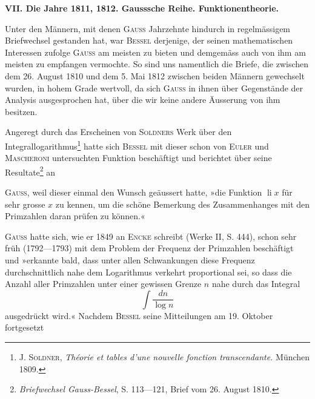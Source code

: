 \par\bigskip
\begin{center}
\textbf{VII. Die Jahre 1811, 1812. Gausssche Reihe. Funktionentheorie.}\\[6pt]
\end{center}
\noindent\hspace*{\parindent}Unter den Männern, mit denen \textsc{Gauss} Jahrzehnte hindurch in regelmässigem
Briefwechsel gestanden hat, war \textsc{Bessel} derjenige, der seinen mathematischen
Interessen zufolge \textsc{Gauss} am meisten zu bieten und demgemäss
auch von ihm am meisten zu empfangen vermochte. So sind uns namentlich
die Briefe, die zwischen dem 26. August 1810 und dem 5. Mai 1812 zwischen
beiden Männern gewechselt wurden, in hohem Grade wertvoll, da sich \textsc{Gauss}
in ihnen über Gegenstände der Analysis ausgesprochen hat, über die wir
keine andere Äusserung von ihm besitzen.
\par
Angeregt durch das Erscheinen von \textsc{Soldners} Werk über den Integrallogarithmus\footnote{J. \textsc{Soldner}, \textit{Théorie et tables d’une nouvelle fonction transcendante.} München 1809.}
hatte sich \textsc{Bessel} mit dieser schon von \textsc{Euler} und \textsc{Mascheroni}
untersuchten Funktion beschäftigt und berichtet über seine Resultate\footnote{\textit{Briefwechsel Gauss-Bessel}, S. 113—121, Brief vom 26. August 1810.} an\par
\clearpage{}
\noindent \textsc{Gauss}, weil dieser einmal den Wunsch geäussert hatte, »die Funktion \(\operatorname{li}x\) für
sehr grosse \(x\) zu kennen, um die schöne Bemerkung des Zusammenhanges
mit den Primzahlen daran prüfen zu können.«
\par
\textsc{Gauss} hatte sich, wie er 1849 an \textsc{Encke} schreibt (Werke II, S. 444),
schon sehr früh (1792—1793) mit dem Problem der Frequenz der Primzahlen
beschäftigt und »erkannte bald, dass unter allen Schwankungen diese Frequenz
durchschnittlich nahe dem Logarithmus verkehrt proportional sei, so dass die
Anzahl aller Primzahlen unter einer gewissen Grenze \(n\) nahe durch das Integral
\begingroup\makeatletter\tagsleft@true\let\veqno\leqno\makeatother
\begin{equation*}
\int\frac{dn}{\log n}\tag{1}
\end{equation*}\endgroup
\noindent ausgedrückt wird.« Nachdem \textsc{Bessel} seine Mitteilungen am 19. Oktober fortgesetzt
